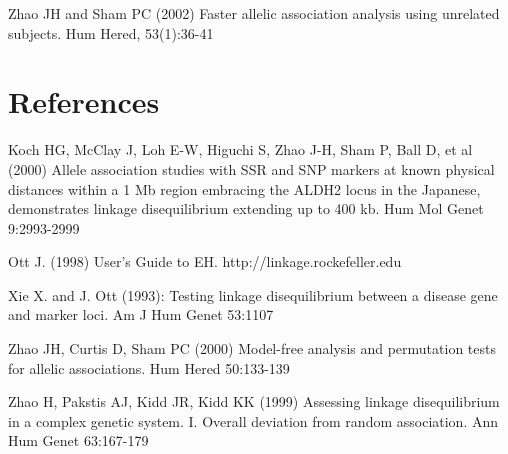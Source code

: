 \documentclass[11pt]{article}
\begin{document}
Zhao JH and Sham PC (2002) Faster allelic association analysis using unrelated
subjects.  Hum Hered, 53(1):36-41


\section{References}

\medskip
\noindent
Koch HG, McClay J, Loh E-W, Higuchi S, Zhao J-H, Sham P, Ball D, et al (2000)
Allele association studies with SSR and SNP markers at known physical distances
within a 1 Mb region embracing the ALDH2 locus in the Japanese, demonstrates
linkage disequilibrium extending up to 400 kb.  Hum Mol Genet 9:2993-2999

\medskip
\noindent
Ott J. (1998) User's Guide to EH. http://linkage.rockefeller.edu

\medskip
\noindent
Xie X.  and J.  Ott (1993):  Testing linkage disequilibrium between a disease
gene and marker loci.  Am J Hum Genet 53:1107

\medskip
\noindent
Zhao JH, Curtis D, Sham PC (2000) Model-free analysis and permutation tests for
allelic associations. Hum Hered 50:133-139

\medskip
\noindent
Zhao H, Pakstis AJ, Kidd JR, Kidd KK (1999) Assessing linkage disequilibrium in
a complex genetic system. I. Overall deviation from random association. Ann
Hum Genet 63:167-179
\end{document}
